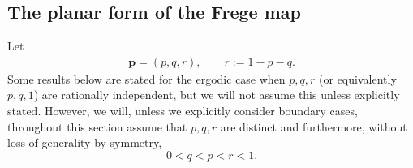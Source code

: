 \documentclass[11pt,reqno,tbtags,a4paper]{amsart}
\numberwithin{equation}{section}
\theoremstyle{plain}%
\theoremstyle{definition}
\theoremstyle{remark}
\newcounter{cases}
\newcommand\vp{\mathbf{p}}
\newcommand\0{{\boldsymbol 0}}
\newcommand\1{{\boldsymbol 1}}
\begin{document}
\subsection{The planar form of the Frege map}\label{SSm3planar}


Let
\begin{align}\label{vp}
\vp=(p,q,r),\qquad r:=1-p-q.
\end{align}
Some results below are stated for the ergodic case when $p,q,r$ 
(or equivalently $p,q,1$) are rationally independent,
but we will not assume this unless explicitly stated.
However, we will, unless we explicitly consider boundary cases, 
throughout this section assume that $p,q,r$ are distinct and furthermore, 
without loss of generality by symmetry,  
\begin{equation}\label{m3-parameter-region}
0<q<p<r<1.
\end{equation}
\end{document}
